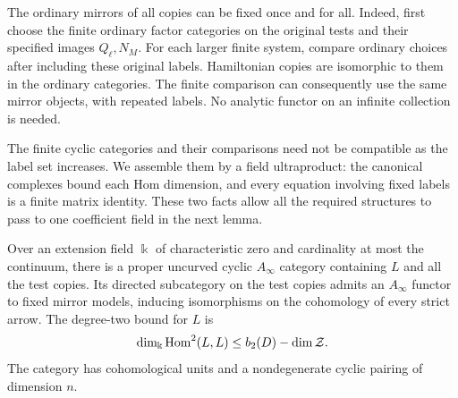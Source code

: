 The ordinary mirrors of all copies can be fixed once and for all.
Indeed, first choose the finite ordinary factor categories on the
original tests and their specified images $Q_\ell,N_M$.  For each larger
finite system, compare ordinary choices after including these original
labels.  Hamiltonian copies are isomorphic to them in the ordinary
categories.  The finite comparison can consequently use the same
mirror objects, with repeated labels.  No analytic functor on an
infinite collection is needed.

The finite cyclic categories and their comparisons need not be
compatible as the label set increases.  We assemble them by a field
ultraproduct: the canonical complexes bound each Hom dimension, and
every equation involving fixed labels is a finite matrix identity.
These two facts allow all the required structures to pass to one
coefficient field in the next lemma.

\begin{lemma}
\label{realization:field}
Over an extension field $\Bbbk$ of characteristic zero and cardinality
at most the continuum, there is a proper uncurved cyclic
$A_\infty$ category containing $L$ and all the test copies.  Its
directed subcategory on the test copies admits an $A_\infty$ functor to fixed mirror
models, inducing isomorphisms on the cohomology of every strict arrow.
The degree-two bound for $L$ is
\begin{equation}
 \dim_{\Bbbk}\operatorname{Hom}^2(L,L)
 \le b_2(D)-\dim\mathcal Z.
 \label{realization:ambient-bound}
\end{equation}
The category has cohomological units and a nondegenerate cyclic pairing
of dimension $n$.
\end{lemma}

